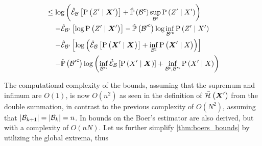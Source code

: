 \begin{proofE}
\begin{align}
\begin{split}
		\end{split}\\
		\begin{split}
			&\leq\log\left(\partialestimator{\probcond{\observations{}^\prime}{\statesRV{}^\prime}}{\subSpace}+\estimatedmeasure{\stcomp{\subSpace}}\sup_{\stcomp{\subSpace}}\probcond{\observations{}^\prime}{\states{}^\prime}\right)\\
			&\phantomeq-\partialestimator{\log\probcond{\observations{}^\prime}{\statesRV{}^\prime}}{\subSpace^\prime}-\estimatedmeasure{\stcomp{\subSpace^\prime}}\log\inf_{\stcomp{\subSpace^\prime}}\probcond{\observations{}^\prime}{\states{}^\prime}\\
			&\phantomeq-\partialestimator{\log\left(\partialestimator{\probcond{\statesRV{}^\prime}{\statesRV{}}}{\subSpace}+\inf_{\stcomp{\subSpace}}\probcond{\statesRV{}^\prime}{\states{}}\right)}{\subSpace^\prime}\\
			&\phantomeq-\estimatedmeasure{\stcomp{\subSpace^\prime}}\log\left(\inf_{\stcomp{\subSpace^\prime}}\partialestimator{\probcond{\states{}^\prime}{\statesRV{}}}{\subSpace}+\inf_{\stcomp{\subSpace},\stcomp{\subSpace^\prime}}\probcond{\states{}^\prime}{\states{}}\right)
		\end{split}
	\end{align}
\end{proofE}

The computational complexity of the bounds, assuming that the supremum and infimum are $O(1)$, is now $O(n^2)$ as seen in the definition of $\bar{\mathcal{H}}_{}\left({\boldsymbol X_{}^\prime}\right)$ from the double summation, in contrast to the previous complexity of $O(N^2)$, assuming that $\lvert\mathcal{B}_{k+1}\rvert=\lvert\mathcal{B}_{k}\rvert=n$. In \cite{Sztyglic22iros} bounds on the Boer's estimator are also derived, but with a complexity of $O(nN)$. Let us further simplify \cref{thm:boers_bounds} by utilizing the global extrema, thus

